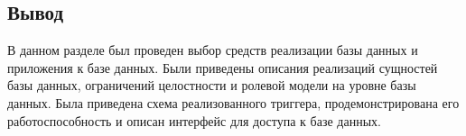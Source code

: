 
\subsection{Вывод}

В данном разделе был проведен выбор средств реализации базы данных и приложения к базе данных.
Были приведены описания реализаций сущностей базы данных, ограничений целостности и ролевой модели на уровне базы данных.
Была приведена схема реализованного триггера, продемонстрирована его работоспособность и описан интерфейс для доступа к базе данных.
